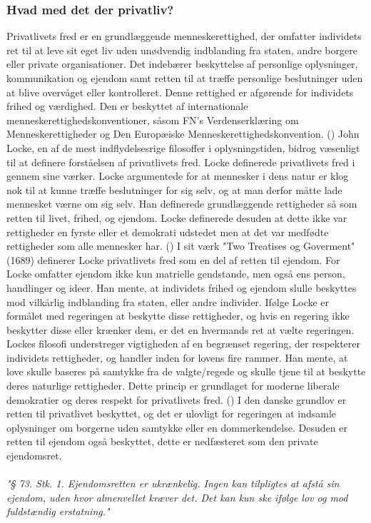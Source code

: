 \subsubsection{Hvad med det der privatliv?} %
Privatlivets fred er en grundlæggende menneskerettighed, der omfatter individets ret til at leve sit eget liv uden unødvendig indblanding fra staten, andre borgere eller private organisationer. Det indebærer beskyttelse af personlige oplysninger, kommunikation og ejendom samt retten til at træffe personlige beslutninger uden at blive overvåget eller kontrolleret. Denne rettighed er afgørende for individets frihed og værdighed. Den er beskyttet af internationale menneskerettighedskonventioner, såsom FN's Verdenserklæring om Menneskerettigheder og Den Europæiske Menneskerettighedskonvention. (\cite{LockeFaktalink})
John Locke, en af de mest indflydelsesrige filosoffer i oplysningstiden, bidrog væsenligt til at definere forståelsen af privatlivets fred. Locke definerede privatlivets fred i gennem sine værker. Locke argumentede for at mennesker i dens natur er klog nok til at kunne træffe beslutninger for sig selv, og at man derfor måtte lade mennesket værne om sig selv. Han definerede grundlæggende rettigheder så som retten til livet, frihed, og ejendom. Locke definerede desuden at dette ikke var rettigheder en fyrste eller et demokrati udstedet men at det var medfødte rettigheder som alle mennesker har. (\cite{LockeFaktalink})
I sit værk "Two Treatises og Goverment" (1689) definerer Locke privatlivets fred som en del af retten til ejendom. For Locke omfatter ejendom ikke kun matrielle gendstande, men også ens person, handlinger og ideer. Han mente, at individets frihed og ejendom slulle beskyttes mod vilkårlig indblanding fra staten, eller andre individer. Ifølge Locke er formålet med regeringen at beskytte disse rettigheder, og hvis en regering ikke beskytter disse eller krænker dem, er det en hvermands ret at vælte regeringen. Lockes filosofi understreger vigtigheden af en begrænset regering, der respekterer individets rettigheder, og handler inden for lovens fire rammer. Han mente, at love skulle baseres på samtykke fra de valgte/regede og skulle tjene til at beskytte deres naturlige rettigheder. Dette princip er grundlaget for moderne liberale demokratier og deres respekt for privatlivets fred. (\cite{LockeBog})
I den danske grundlov er retten til privatlivet beskyttet, og det er ulovligt for regeringen at indsamle oplysninger om borgerne uden samtykke eller en dommerkendelse. Desuden er retten til ejendom også beskyttet, dette er nedfæsteret som den private ejendomsret. \\\\ \emph{"§ 73. Stk. 1. Ejendomsretten er ukrænkelig. Ingen kan tilpligtes at afstå sin ejendom, uden hvor almenvellet kræver det. Det kan kun ske ifølge lov og mod fuldstændig erstatning."} \\ \\
